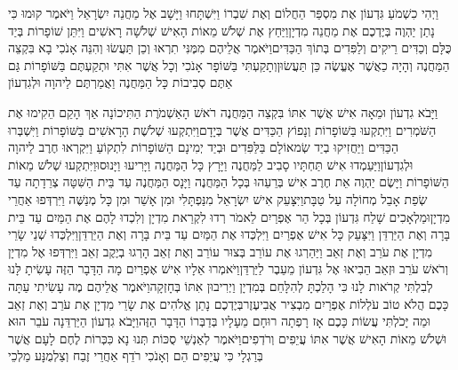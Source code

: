 \documentclass[../main/main.tex]{subfiles}
\begin{document}
\begin{multicols*}{\ncols}
וַיְהִי כִשְׁמֹעַ גִּדְעוֹן אֶת מִסְפַּר הַחֲלוֹם וְאֶת שִׁבְרוֹ וַיִּשְׁתָּחוּ וַיָּשָׁב אֶל מַחֲנֵה יִשְׂרָאֵל וַיֹּאמֶר קוּמוּ כִּי נָתַן יַהְוֶה בְּיֶדְכֶם אֶת מַחֲנֵה מִדְיָן\PreVerseSpace{}וַיַּחַץ אֶת שְׁלֹשׁ מֵאוֹת הָאִישׁ שְׁלֹשָׁה רָאשִׁים וַיִּתֵּן שׁוֹפָרוֹת בְּיַד כֻּלָּם וְכַדִּים רֵיקִים וְלַפִּדִים בְּתוֹךְ הַכַּדִּים\PreVerseSpace{}וַיֹּאמֶר אֲלֵיהֶם מִמֶּנִּי תִרְאוּ וְכֵן תַּעֲשׂוּ וְהִנֵּה אָנֹכִי בָא בִּקְצֵה הַמַּחֲנֶה וְהָיָה כַאֲשֶׁר אֶעֱשֶׂה כֵּן תַּעֲשׂוּן\PreVerseSpace{}וְתָקַעְתִּי בַּשּׁוֹפָר אָנֹכִי וְכָל אֲשֶׁר אִתִּי וּתְקַעְתֶּם בַּשּׁוֹפָרוֹת גַּם אַתֶּם סְבִיבוֹת כָּל הַמַּחֲנֶה וַאֲמַרְתֶּם לַיהוָה וּלְגִדְעוֹן\OpenSection{}\par
{}וַיָּבֹא גִדְעוֹן וּמֵאָה אִישׁ אֲשֶׁר אִתּוֹ בִּקְצֵה הַמַּחֲנֶה רֹאשׁ הָאַשְׁמֹרֶת הַתִּיכוֹנָה אַךְ הָקֵם הֵקִימוּ אֶת הַשֹּׁמְרִים וַיִּתְקְעוּ בַּשּׁוֹפָרוֹת וְנָפוֹץ הַכַּדִּים אֲשֶׁר בְּיָדָם\PreVerseSpace{}וַיִּתְקְעוּ שְׁלֹשֶׁת הָרָאשִׁים בַּשּׁוֹפָרוֹת וַיִּשְׁבְּרוּ הַכַּדִּים וַיַּחֲזִיקוּ בְיַד שְׂמאוֹלָם בַּלַּפִּדִים וּבְיַד יְמִינָם הַשּׁוֹפָרוֹת לִתְקוֹעַ וַיִּקְרְאוּ חֶרֶב לַיהוָה וּלְגִדְעוֹן\PreVerseSpace{}וַיַּעַמְדוּ אִישׁ תַּחְתָּיו סָבִיב לַמַּחֲנֶה וַיָּרָץ כָּל הַמַּחֲנֶה וַיָּרִיעוּ וַיָּנוּסוּ\SubEnd{}\PreVerseSpace{}וַיִּתְקְעוּ שְׁלֹשׁ מֵאוֹת הַשּׁוֹפָרוֹת וַיָּשֶׂם יַהְוֶה אֵת חֶרֶב אִישׁ בְּרֵעֵהוּ בְּכָל\SubEnd{} הַמַּחֲנֶה וַיָּנָס הַמַּחֲנֶה עַד בֵּית הַשִּׁטָּה צְרֵדָתָה\SubEnd{} עַד שְׂפַת אָבֵל מְחוֹלָה עַל טַבָּת\PreVerseSpace{}וַיִּצָּעֵק אִישׁ יִשְׂרָאֵל מִנַּפְתָּלִי וּמִן אָשֵׁר וּמִן כָּל מְנַשֶּׁה וַיִּרְדְּפוּ אַחֲרֵי מִדְיָן\PreVerseSpace{}וּמַלְאָכִים שָׁלַח גִּדְעוֹן בְּכָל הַר אֶפְרַיִם לֵאמֹר רְדוּ לִקְרַאת מִדְיָן וְלִכְדוּ לָהֶם אֶת הַמַּיִם עַד בֵּית בָּרָה וְאֶת הַיַּרְדֵּן וַיִּצָּעֵק כָּל אִישׁ אֶפְרַיִם וַיִּלְכְּדוּ אֶת הַמַּיִם עַד בֵּית בָּרָה וְאֶת הַיַּרְדֵּן\PreVerseSpace{}וַיִּלְכְּדוּ שְׁנֵי שָׂרֵי מִדְיָן אֶת עֹרֵב וְאֶת זְאֵב וַיַּהַרְגוּ אֶת עוֹרֵב בְּצוּר עוֹרֵב וְאֶת זְאֵב הָרְגוּ בְיֶקֶב זְאֵב וַיִּרְדְּפוּ אֶל מִדְיָן וְרֹאשׁ עֹרֵב וּזְאֵב הֵבִיאוּ אֶל גִּדְעוֹן מֵעֵבֶר לַיַּרְדֵּן\PreChapterSpace{}וַיֹּאמְרוּ אֵלָיו אִישׁ אֶפְרַיִם מָה הַדָּבָר הַזֶּה עָשִׂיתָ לָּנוּ לְבִלְתִּי קְרֹאות לָנוּ כִּי הָלַכְתָּ לְהִלָּחֵם בְּמִדְיָן וַיְרִיבוּן אִתּוֹ בְּחָזְקָה\PreVerseSpace{}וַיֹּאמֶר אֲלֵיהֶם מֶה עָשִׂיתִי עַתָּה כָּכֶם הֲלֹא טוֹב עֹלְלוֹת אֶפְרַיִם מִבְצִיר אֲבִיעֶזֶר\PreVerseSpace{}בְּיֶדְכֶם נָתַן אֱלֹהִים אֶת שָׂרֵי מִדְיָן אֶת עֹרֵב וְאֶת זְאֵב וּמַה יָּכֹלְתִּי עֲשׂוֹת כָּכֶם אָז רָפְתָה רוּחָם מֵעָלָיו בְּדַבְּרוֹ הַדָּבָר הַזֶּה\PreVerseSpace{}וַיָּבֹא גִדְעוֹן הַיַּרְדֵּנָה עֹבֵר הוּא וּשְׁלֹשׁ מֵאוֹת הָאִישׁ אֲשֶׁר אִתּוֹ עֲיֵפִים וְרֹדְפִים\PreVerseSpace{}וַיֹּאמֶר לְאַנְשֵׁי סֻכּוֹת תְּנוּ נָא כִּכְּרוֹת לֶחֶם לָעָם אֲשֶׁר בְּרַגְלָי כִּי עֲיֵפִים הֵם וְאָנֹכִי רֹדֵף אַחֲרֵי זֶבַח וְצַלְמֻנָּע מַלְכֵי 
\end{multicols*}
\end{document}
